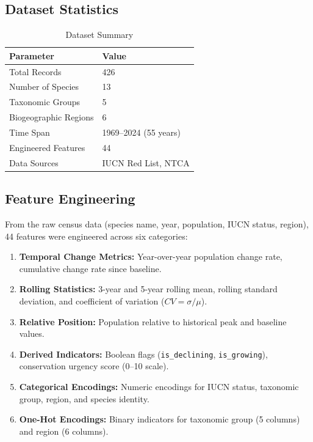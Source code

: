 \documentclass[conference]{IEEEtran}
\begin{document}
\subsection{Dataset Statistics}

\begin{table}[h]
\caption{Dataset Summary}
\label{tab:summary}
\centering
\begin{tabular}{ll}
\toprule
\textbf{Parameter} & \textbf{Value} \\
\midrule
Total Records & 426 \\
Number of Species & 13 \\
Taxonomic Groups & 5 \\
Biogeographic Regions & 6 \\
Time Span & 1969--2024 (55 years) \\
Engineered Features & 44 \\
Data Sources & IUCN Red List, NTCA \\
\bottomrule
\end{tabular}
\end{table}

\subsection{Feature Engineering}
\label{sec:features}
From the raw census data (species name, year, population, IUCN status, region), 44 features were engineered across six categories:

\begin{enumerate}
\item \textbf{Temporal Change Metrics:} Year-over-year population change rate, cumulative change rate since baseline.
\item \textbf{Rolling Statistics:} 3-year and 5-year rolling mean, rolling standard deviation, and coefficient of variation ($CV = \sigma / \mu$).
\item \textbf{Relative Position:} Population relative to historical peak and baseline values.
\item \textbf{Derived Indicators:} Boolean flags (\texttt{is\_declining}, \texttt{is\_growing}), conservation urgency score (0--10 scale).
\item \textbf{Categorical Encodings:} Numeric encodings for IUCN status, taxonomic group, region, and species identity.
\item \textbf{One-Hot Encodings:} Binary indicators for taxonomic group (5 columns) and region (6 columns).
\end{enumerate}
\end{document}

